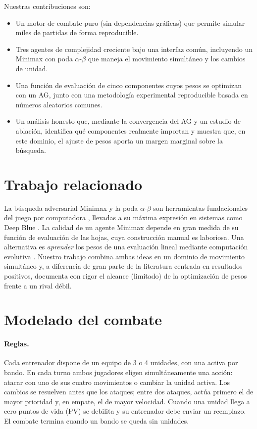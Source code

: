 \documentclass[11pt]{article}
\begin{document}
Nuestras contribuciones son:
\begin{itemize}
  \item Un motor de combate puro (sin dependencias gráficas) que permite simular
        miles de partidas de forma reproducible.
  \item Tres agentes de complejidad creciente bajo una interfaz común,
        incluyendo un Minimax con poda $\alpha$-$\beta$ que maneja el movimiento
        simultáneo y los cambios de unidad.
  \item Una función de evaluación de cinco componentes cuyos pesos se optimizan
        con un AG, junto con una metodología experimental reproducible basada en
        números aleatorios comunes.
  \item Un análisis honesto que, mediante la convergencia del AG y un estudio de
        ablación, identifica qué componentes realmente importan y muestra que,
        en este dominio, el ajuste de pesos aporta un margen marginal sobre la
        búsqueda.
\end{itemize}

\section{Trabajo relacionado}

La búsqueda adversarial Minimax y la poda $\alpha$-$\beta$ son herramientas
fundacionales del juego por computadora \citep{shannon1950,knuth1975}, llevadas a
su máxima expresión en sistemas como Deep Blue \citep{campbell2002}. La calidad de
un agente Minimax depende en gran medida de su función de evaluación de las hojas,
cuya construcción manual es laboriosa. Una alternativa es \emph{aprender} los
pesos de una evaluación lineal mediante computación evolutiva
\citep{holland1975,goldberg1989,eiben2015}. Nuestro trabajo combina ambas ideas en
un dominio de movimiento simultáneo y, a diferencia de gran parte de la
literatura centrada en resultados positivos, documenta con rigor el alcance
(limitado) de la optimización de pesos frente a un rival débil.

\section{Modelado del combate}
\label{sec:modelo}

\paragraph{Reglas.} Cada entrenador dispone de un equipo de 3 o 4 unidades, con
una activa por bando. En cada turno ambos jugadores eligen simultáneamente una
acción: atacar con uno de sus cuatro movimientos o cambiar la unidad activa. Los
cambios se resuelven antes que los ataques; entre dos ataques, actúa primero el de
mayor prioridad y, en empate, el de mayor velocidad. Cuando una unidad llega a
cero puntos de vida (PV) se debilita y su entrenador debe enviar un reemplazo. El
combate termina cuando un bando se queda sin unidades.
\end{document}
